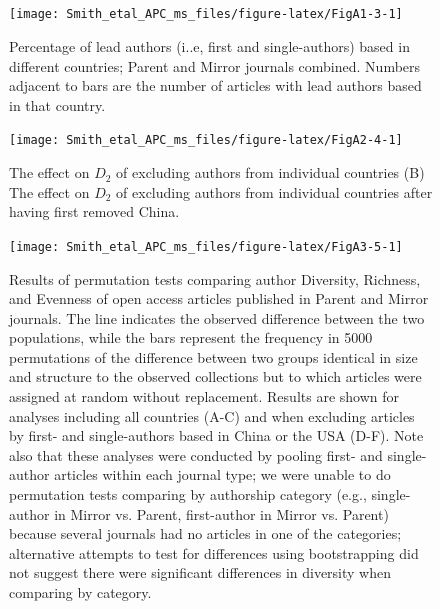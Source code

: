 \documentclass[
  english,
  man]{apa6}
\newcommand{\blandscape}{\begin{landscape}}
\newcommand{\elandscape}{\end{landscape}}
\begin{document}
\begin{appendix}
\section{}
\begin{figure}

{\centering \texttt{[image: Smith\_etal\_APC\_ms\_files/figure-latex/FigA1-3-1]} 

}

\caption{Percentage of lead authors (i..e, first and single-authors) based in different countries; Parent and Mirror journals combined. Numbers adjacent to bars are the number of articles with lead authors based in that country.}\label{fig:FigA1-3}
\end{figure}

\newpage
\blandscape

\begin{figure}

{\centering \texttt{[image: Smith\_etal\_APC\_ms\_files/figure-latex/FigA2-4-1]} 

}

\caption{The effect on $D_{2}$ of excluding authors from individual countries (B) The effect on $D_{2}$ of excluding authors from individual countries after having first removed China.}\label{fig:FigA2-4}
\end{figure}

\elandscape
\newpage

\begin{figure}

{\centering \texttt{[image: Smith\_etal\_APC\_ms\_files/figure-latex/FigA3-5-1]} 

}

\caption{Results of permutation tests comparing author Diversity, Richness, and Evenness of open access articles published in Parent and Mirror journals. The line indicates the observed difference between the two populations, while the bars represent the frequency in 5000 permutations of the difference between two groups identical in size and structure to the observed collections but to which articles were assigned at random without replacement. Results are shown for analyses including all countries (A-C) and when excluding articles by first- and single-authors based in China or the USA (D-F). Note also that these analyses were conducted by pooling first- and single-author articles within each journal type; we were unable to do permutation tests comparing by authorship category (e.g., single-author in Mirror vs. Parent, first-author in Mirror vs. Parent) because several journals had no articles in one of the categories; alternative attempts to test for differences using bootstrapping did not suggest there were significant differences in diversity when comparing by category.}\label{fig:FigA3-5}
\end{figure}


\end{appendix}
\end{document}
